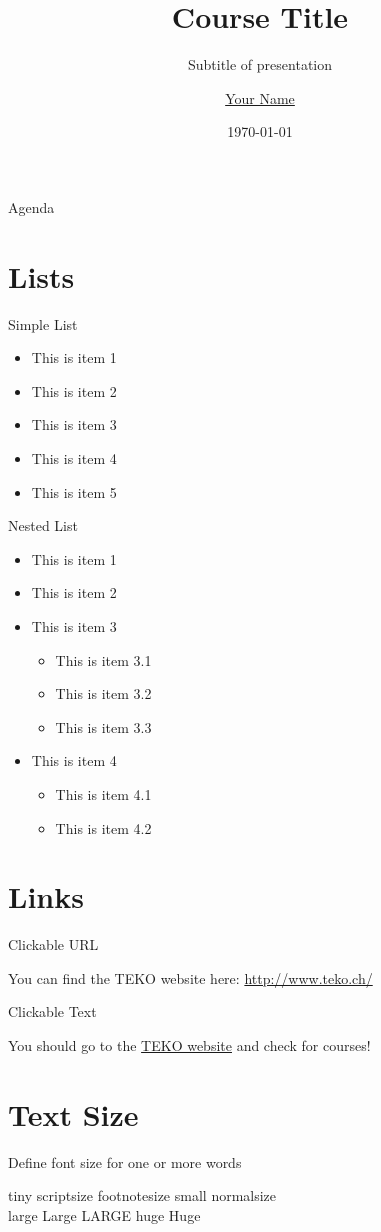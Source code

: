 \documentclass{beamer}
\title{Course Title}
\subtitle{Subtitle of presentation}
\author{\href{http://www.teko.ch/}{Your Name}}
\institute[TEKO]{\href{http://www.teko.ch/}{TEKO Schweizerische Fachschule}}
\date{\today}
\newcommand{\slideItems}[1]{
	\begin{itemize}
		#1
	\end{itemize}
}
\newcommand{\slide}[2]{
	\begin{frame}{#1}
		#2
	\end{frame}
}
\begin{document}
\maketitle
\newlength\someheight

\slide{Agenda}{
	\setcounter{tocdepth}{1}
	\tableofcontents
}

\section{Lists}

\slide{Simple List}{
	\slideItems{
		\item This is item 1
		\item This is item 2
		\item This is item 3
		\item This is item 4
		\item This is item 5
	}
}

\slide{Nested List}{
	\slideItems{
		\item This is item 1
		\item This is item 2
		\item This is item 3
			\slideItems{
				\item This is item 3.1
				\item This is item 3.2
				\item This is item 3.3
			}
		\item This is item 4
			\slideItems{
				\item This is item 4.1
				\item This is item 4.2
			}
	}
}

\section{Links}

\slide{Clickable URL}{
	You can find the TEKO website here: \url{http://www.teko.ch/}
}

\slide{Clickable Text}{
	You should go to the \href{http://www.teko.ch/}{TEKO website} and check for courses!
}

\section{Text Size}

\slide{Define font size for one or more words}{
	\tiny{tiny}
	\scriptsize{scriptsize}
	\footnotesize{footnotesize}
	\small{small}
	\normalsize{normalsize} \\
	\large{large}
	\Large{Large}
	\LARGE{LARGE}
	\huge{huge}
	\Huge{Huge}
}
\end{document}
